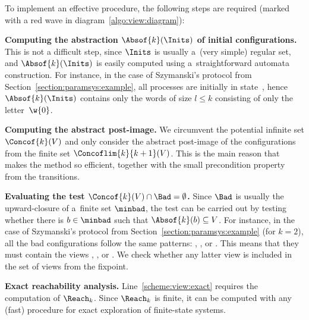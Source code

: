 %
%
To implement an effective procedure, the following steps are required
(marked with a red wave in diagram~\ref{algo:view:diagram}):
%
\begin{strategy}
\item {\bf Computing the abstraction $\Absof{k}(\Inits)$ of initial
    configurations.} %
  This is not a difficult step, since $\Inits$ is usually a~(very
  simple) regular set, and $\Absof{k}(\Inits)$ is easily computed
  using a~straightforward automata construction.
  For instance, in the case of Szymanski's protocol from
  Section~\ref{section:paramsys:example}, all processes are initially
  in state~, hence $\Absof{k}(\Inits)$ contains only the words
  of size $l\leq k$ consisting of only the letter~$\w{0}$. %
%
\item {\bf Computing the abstract post-image.} %
  We circumvent the potential infinite set $\Concof{k}(V)$ and only
  consider the abstract post-image of the configurations from the
  finite set $\Concoflim{k}{k+1}(V)$.
  This is the main reason that makes the method so efficient, together
  with the small precondition property from the transitions.
%
\item {\bf Evaluating the test $\Concof{k}(V)\cap\Bad = \emptyset$.} %
  Since $\Bad$ is usually the upward-closure of a~finite set
  $\minbad$, the test can be carried out by testing whether there is
  $b\in\minbad$ such that $\Absof{k}(b)\subseteq V$.
  For instance, in the case of Szymanski's protocol from
  Section~\ref{section:paramsys:example} (for $k=2$), all the bad
  configurations follow the same patterns: %
  {}, %
  {}, %
  {} or %
  {}. %
  This means that they must contain the views , ,
   or . We check whether any latter view is
  included in the set of views from the fixpoint. %
%
\item {\bf Exact reachability analysis.}  Line~\ref{scheme:view:exact}
  requires the computation of $\Reach_k$. %
  Since $\Reach_k$ is finite, it can be computed with any (fast)
  procedure for exact exploration of finite-state systems.
\end{strategy}
%

